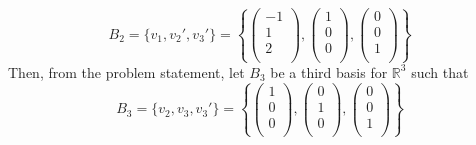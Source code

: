 \documentclass[12pt]{article}
\newcommand{\R}{\mathbb{R}}
\begin{document}
\begin{enumerate}
    $$B_2 = \{v_1, v_2', v_3'\} = 
    \left\{\begin{pmatrix}
        -1 \\ 1 \\ 2 \\ 
    \end{pmatrix}, 
    \begin{pmatrix}
        1 \\ 0 \\ 0 \\ 
    \end{pmatrix}, 
    \begin{pmatrix}
        0 \\ 0 \\ 1 \\ 
    \end{pmatrix} 
    \right\}$$
    Then, from the problem statement, let $B_3$ be a third basis for $\R^3$ such that
    $$B_3 = \{v_2, v_3, v_3'\} = 
    \left\{\begin{pmatrix}
        1 \\ 0 \\ 0 \\ 
    \end{pmatrix}, 
    \begin{pmatrix}
        0 \\ 1 \\ 0 \\ 
    \end{pmatrix}, 
    \begin{pmatrix}
        0 \\ 0 \\ 1 \\ 
    \end{pmatrix} 
    \right\}$$
    

\end{enumerate}
\end{document}
